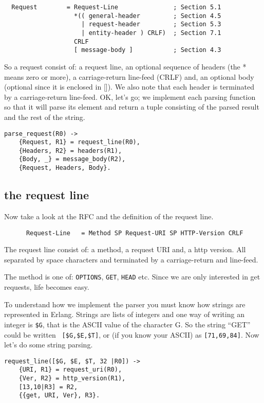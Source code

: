 \documentclass[a4paper,11pt]{article}
\begin{document}
\begin{verbatim}
  Request        = Request-Line               ; Section 5.1
                   *(( general-header         ; Section 4.5
                     | request-header         ; Section 5.3
                     | entity-header ) CRLF)  ; Section 7.1
                   CRLF
                   [ message-body ]           ; Section 4.3
\end{verbatim}


So a request consist of: a request line, an optional sequence of
headers (the * means zero or more), a carriage-return line-feed (CRLF)
and, an optional body (optional since it is enclosed in []). We also
note that each header is terminated by a carriage-return
line-feed. OK, let's go; we implement each parsing function so that it
will parse its element and return a tuple consisting of the parsed
result and the rest of the string.

\begin{verbatim}
parse_request(R0) ->
    {Request, R1} = request_line(R0),
    {Headers, R2} = headers(R1),
    {Body, _} = message_body(R2),
    {Request, Headers, Body}.
\end{verbatim}

\subsection{the request line}

Now take a look at the RFC and the definition of the request line.

\begin{verbatim}
      Request-Line   = Method SP Request-URI SP HTTP-Version CRLF
\end{verbatim}

The request line consist of: a method, a request URI and, a http
version. All separated by space characters and terminated by a
carriage-return and line-feed.


The method is one of: {\tt OPTIONS}, {\tt GET}, {\tt HEAD} etc. Since we
are only interested in get requests, life becomes easy. 

To understand how we implement the parser you must know how strings
are represented in Erlang. Strings are lists of integers and one way
of writing an integer is {\tt \$G}, that is the ASCII value of the
character G. So the string ``GET'' could be written {\tt
  [\$G,\$E,\$T]}, or (if you know your ASCII) as {\tt [71,69,84]}. Now
let's do some string parsing.

\begin{verbatim}
request_line([$G, $E, $T, 32 |R0]) ->
    {URI, R1} = request_uri(R0),
    {Ver, R2} = http_version(R1),
    [13,10|R3] = R2,
    {{get, URI, Ver}, R3}.
\end{verbatim}
\end{document}
